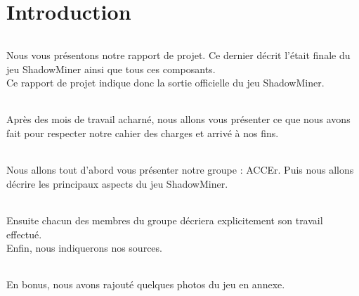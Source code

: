 \documentclass[titlepage, 13px, a4paper]{report}
\begin{document}
\AddToShipoutPicture*{\BackgroundPic}

\maketitle
\tableofcontents


\part{Introduction} 
\paragraph{} \hspace{0pt}
Nous vous présentons notre rapport de projet. Ce dernier décrit l’était finale du jeu ShadowMiner 
ainsi que tous ces composants. \\
Ce rapport de projet indique donc la sortie officielle du jeu ShadowMiner. \\

\paragraph{} \hspace{0pt}
Après des mois de travail acharné, nous allons vous présenter ce que nous avons fait pour respecter 
notre cahier des charges et arrivé à nos fins. \\

\paragraph{} \hspace{0pt}
Nous allons tout d’abord vous présenter notre groupe : ACCEr. Puis nous allons décrire les 
principaux aspects du jeu ShadowMiner. \\

\paragraph{} \hspace{0pt}
Ensuite chacun des membres du groupe décriera explicitement son travail effectué. \\
Enfin, nous indiquerons nos sources. \\

\paragraph{} \hspace{0pt}
En bonus, nous avons rajouté quelques photos du jeu en annexe. \\
\end{document}
